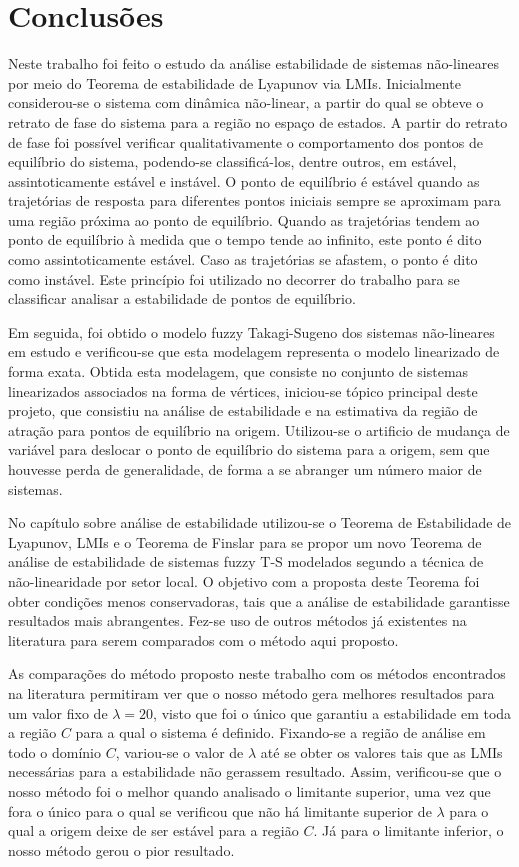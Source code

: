 \chapter{Conclusões}\label{CapConclusoes}

Neste trabalho foi feito o estudo da análise estabilidade de sistemas não-lineares por meio do Teorema de estabilidade de Lyapunov via LMIs. Inicialmente considerou-se o sistema com dinâmica não-linear, a partir do qual se obteve o retrato de fase do sistema para a região no espaço de estados. A partir do retrato de fase foi possível verificar qualitativamente o comportamento dos pontos de equilíbrio do sistema, podendo-se classificá-los, dentre outros, em estável, assintoticamente estável e instável. O ponto de equilíbrio é estável quando as trajetórias de resposta para diferentes pontos iniciais sempre se aproximam para uma região próxima ao ponto de equilíbrio. Quando as trajetórias tendem ao ponto de equilíbrio à medida que o tempo tende ao infinito, este ponto é dito como assintoticamente estável. Caso as trajetórias se afastem, o ponto é dito como instável. Este princípio foi utilizado no decorrer do trabalho para se classificar analisar a estabilidade de pontos de equilíbrio.

Em seguida, foi obtido o modelo fuzzy Takagi-Sugeno dos sistemas não-lineares em estudo e verificou-se que esta modelagem representa o modelo linearizado de forma exata. Obtida esta modelagem, que consiste no conjunto de sistemas linearizados associados na forma de vértices, iniciou-se tópico principal deste projeto, que consistiu na análise de estabilidade e na estimativa da região de atração para pontos de equilíbrio na origem. Utilizou-se o artificio de mudança de variável para deslocar o ponto de equilíbrio do sistema para a origem, sem que houvesse perda de generalidade, de forma a se abranger um número maior de sistemas.

No capítulo sobre análise de estabilidade utilizou-se o Teorema de Estabilidade de Lyapunov, LMIs e o Teorema de Finslar para se propor um novo Teorema de análise de estabilidade de sistemas fuzzy T-S modelados segundo a técnica de não-linearidade por setor local. O objetivo com a proposta deste Teorema foi obter condições menos conservadoras, tais que a análise de estabilidade garantisse resultados mais abrangentes. Fez-se uso de outros métodos já existentes na literatura para serem comparados com o método aqui proposto.

As comparações do método proposto neste trabalho com os métodos encontrados na literatura permitiram ver que o nosso método gera melhores resultados para um valor fixo de $\lambda = 20$, visto que foi o único que garantiu a estabilidade em toda a região $C$ para a qual o sistema é definido. Fixando-se a região de análise em todo o domínio $C$, variou-se o valor de $\lambda$ até se obter os valores tais que as LMIs necessárias para a estabilidade não gerassem resultado. Assim, verificou-se que o nosso método foi o melhor quando analisado o limitante superior, uma vez que fora o único para o qual se verificou que não há limitante superior de $\lambda$ para o qual a origem deixe de ser estável para a região $C$. Já para o limitante inferior, o nosso método gerou o pior resultado.

